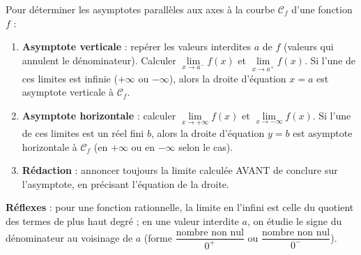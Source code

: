 \documentclass[11pt]{article}
\begin{document}
\begin{methode}
Pour déterminer les asymptotes parallèles aux axes à la courbe $\mathcal{C}_f$ d'une fonction $f$ :
\begin{enumerate}
\item \textbf{Asymptote verticale} : repérer les valeurs interdites $a$ de $f$ (valeurs qui annulent le dénominateur). Calculer $\lim\limits_{x\to a^-}f(x)$ et $\lim\limits_{x\to a^+}f(x)$. Si l'une de ces limites est infinie ($+\infty$ ou $-\infty$), alors la droite d'équation $\boxed{x=a}$ est asymptote verticale à $\mathcal{C}_f$.
\item \textbf{Asymptote horizontale} : calculer $\lim\limits_{x\to+\infty}f(x)$ et $\lim\limits_{x\to-\infty}f(x)$. Si l'une de ces limites est un réel fini $b$, alors la droite d'équation $\boxed{y=b}$ est asymptote horizontale à $\mathcal{C}_f$ (en $+\infty$ ou en $-\infty$ selon le cas).
\item \textbf{Rédaction} : annoncer toujours la limite calculée AVANT de conclure sur l'asymptote, en précisant l'équation de la droite.
\end{enumerate}
\textbf{Réflexes} : pour une fonction rationnelle, la limite en l'infini est celle du quotient des termes de plus haut degré ; en une valeur interdite $a$, on étudie le signe du dénominateur au voisinage de $a$ (forme $\dfrac{\text{nombre non nul}}{0^+}$ ou $\dfrac{\text{nombre non nul}}{0^-}$).
\end{methode}
\end{document}
